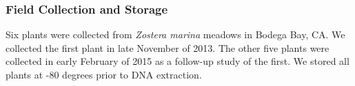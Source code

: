 
\subsubsection{\textbf{Field Collection and Storage}}

    Six plants were collected from \textit{Zostera marina} meadows in Bodega Bay, CA. We collected the first plant in late November of 2013. The other five plants were collected in early February of 2015 as a follow-up study of the first. We stored all plants at -80 degrees prior to DNA extraction. 
    
    